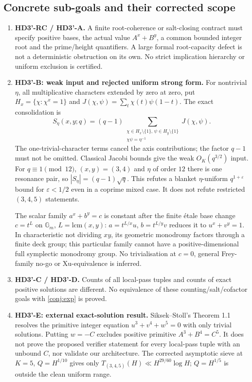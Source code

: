 \documentclass[11pt,a4paper]{article}
\begin{document}
\subsection*{Concrete sub-goals and their corrected scope}
\begin{enumerate}[leftmargin=*]
\item \textbf{HD3'-RC / HD3'-A.} A finite root-coherence or salt-closing
contract must specify positive bases, the actual value $A^x+B^y$, a
common bounded integer root and the prime/height quantifiers. A large
formal root-capacity defect is not a deterministic obstruction on its
own. No strict implication hierarchy or uniform exclusion is certified.
\item \textbf{HD3'-B: weak input and rejected uniform strong form.}
For nontrivial $\eta$, all multiplicative characters extended by zero
at zero, put $H_x=\{\chi:\chi^x=1\}$ and
$J(\chi,\psi)=\sum_t\chi(t)\psi(1-t)$. The exact consolidation is
\[
 S_\eta(x,y;q)=(q-1)
 \sum_{\substack{\chi\in H_x\setminus\{1\},\,\psi\in H_y\setminus\{1\}\\
                 \chi\psi=\eta^{-1}}}J(\chi,\psi).
\]
The one-trivial-character terms cancel the axis contributions;
the factor $q-1$ must not be omitted. Classical Jacobi bounds
\cite[Ch.~8]{IrelandRosen} give the weak $O_K(q^{3/2})$ input.
For $q\equiv1\pmod{12}$, $(x,y)=(3,4)$ and $\eta$ of order $12$
there is one resonance pair, so
$|S_\eta|=(q-1)\sqrt q$. This refutes a blanket
$\eta$-uniform $q^{1+\varepsilon}$ bound for $\varepsilon<1/2$
even in a coprime mixed case. It does not refute restricted
$(3,4,5)$ statements.

The scalar family $a^x+b^y=c$ is constant after the finite étale
base change $c=t^L$ on $\mathbb G_m$, $L=\mathrm{lcm}(x,y)$:
$a=t^{L/x}u$, $b=t^{L/y}v$ reduces it to $u^x+v^y=1$.
In characteristic not dividing $xy$, its geometric monodromy factors
through a finite deck group; this particular family cannot have a
positive-dimensional full symplectic monodromy group.
No trivialisation at $c=0$, general Frey-family no-go or Xu-equivalence
\cite{Xu2020,FouvryKatz2001,KatzTwistedL} is inferred.
\item \textbf{HD3'-C / HD3'-D.} Counts of all local-pass tuples and
counts of exact positive solutions are different. No equivalence of
these counting/salt/cofactor goals with \cref{conj:exp} is proved.
\item \textbf{HD3'-E: external exact-solution result.}
Siksek--Stoll's Theorem 1.1 \cite{SiksekStoll2012} resolves the
primitive integer equation $u^3+v^4+w^5=0$ with only trivial solutions.
Putting $w=-C$ excludes positive primitive $A^3+B^4=C^5$.
It does not prove the proposed verifier statement for every local-pass
tuple with an unbound $C$, nor validate our architecture.
The corrected asymptotic sieve at $K=5$, $Q=H^{1/10}$ gives only
$T_{(3,4,5)}(H)\ll H^{29/60}\log H$; $Q=H^{1/5}$ is outside
the clean uniform range.
\end{enumerate}
\end{document}
